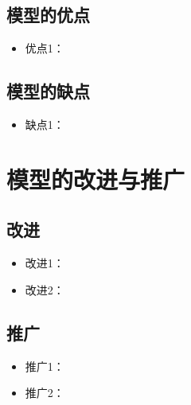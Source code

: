 \documentclass[withoutpreface,bwprint]{cumcmthesis}
\begin{document}
\subsection{模型的优点}
\begin{itemize}[itemindent=2em]
\item 优点1：
\end{itemize}

\subsection{模型的缺点}
\begin{itemize}[itemindent=2em]
\item 缺点1：
\end{itemize}

\section{模型的改进与推广}

\subsection{改进}
\begin{itemize}[itemindent=2em]
   \item 改进1：
   \item 改进2：
\end{itemize}


\subsection{推广}
\begin{itemize}[itemindent=2em]
    \item 推广1：
   \item 推广2：
\end{itemize}
\newpage
\nocite{*}
\end{document}
